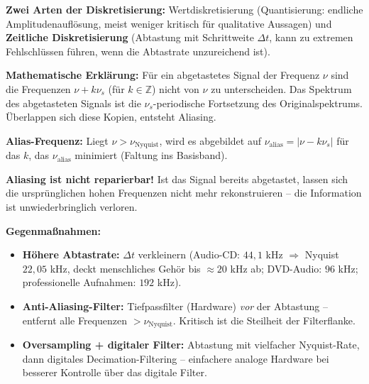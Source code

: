 \textbf{Zwei Arten der Diskretisierung:} Wertdiskretisierung (Quantisierung: endliche Amplitudenauflösung, meist weniger kritisch für qualitative Aussagen) und \textbf{Zeitliche Diskretisierung} (Abtastung mit Schrittweite $\Delta t$, kann zu extremen Fehlschlüssen führen, wenn die Abtastrate unzureichend ist).


\textbf{Mathematische Erklärung:} Für ein abgetastetes Signal der Frequenz $\nu$ sind die Frequenzen $\nu + k\nu_s$ (für $k \in \mathbb{Z}$) nicht von $\nu$ zu unterscheiden. Das Spektrum des abgetasteten Signals ist die $\nu_s$-periodische Fortsetzung des Originalspektrums. Überlappen sich diese Kopien, entsteht Aliasing.



\textbf{Alias-Frequenz:} Liegt $\nu > \nu_\mathrm{Nyquist}$, wird es abgebildet auf $\nu_\mathrm{alias} = |\nu - k\nu_s|$ für das $k$, das $\nu_\mathrm{alias}$ minimiert (Faltung ins Basisband).

\textbf{Aliasing ist nicht reparierbar!} Ist das Signal bereits abgetastet, lassen sich die ursprünglichen hohen Frequenzen nicht mehr rekonstruieren -- die Information ist unwiederbringlich verloren.

\textbf{Gegenmaßnahmen:}
\begin{itemize}[leftmargin=1.5em]
    \item \textbf{Höhere Abtastrate:} $\Delta t$ verkleinern (Audio-CD: $44{,}1$ kHz $\Rightarrow$ Nyquist $22{,}05$ kHz, deckt menschliches Gehör bis $\approx 20$ kHz ab; DVD-Audio: $96$ kHz; professionelle Aufnahmen: $192$ kHz).
    \item \textbf{Anti-Aliasing-Filter:} Tiefpassfilter (Hardware) \emph{vor} der Abtastung -- entfernt alle Frequenzen $> \nu_\mathrm{Nyquist}$. Kritisch ist die Steilheit der Filterflanke.
    \item \textbf{Oversampling + digitaler Filter:} Abtastung mit vielfacher Nyquist-Rate, dann digitales Decimation-Filtering -- einfachere analoge Hardware bei besserer Kontrolle über das digitale Filter.
\end{itemize}

